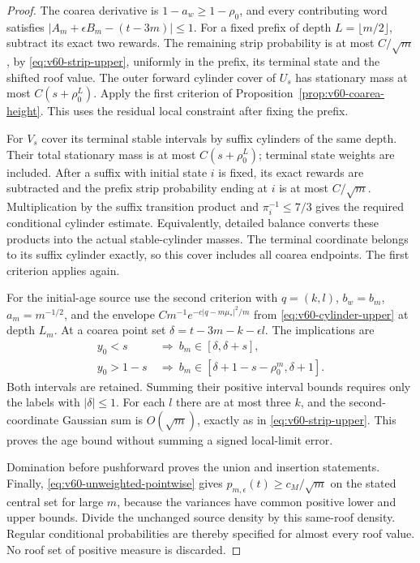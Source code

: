 \begin{proof}
The coarea derivative is $1-a_w\ge1-\rho_0$, and every contributing
word satisfies $|A_m+\epsilon B_m-(t-3m)|\le1$.
For a fixed prefix of depth $L=\lfloor m/2\rfloor$, subtract its
exact two rewards. The remaining strip probability is at most
$C/\sqrt m$, by \eqref{eq:v60-strip-upper}, uniformly in the prefix,
its terminal state and the shifted roof value. The outer forward
cylinder cover of $U_s$ has stationary mass at most $C(s+\rho_0^L)$.
Apply the first criterion of Proposition~\ref{prop:v60-coarea-height}.
This uses the residual local constraint after fixing the prefix.

For $V_s$ cover its terminal stable intervals by suffix cylinders of
the same depth. Their total stationary mass is at most
$C(s+\rho_0^L)$; terminal state weights are included. After a suffix
with initial state $i$ is fixed, its exact rewards are subtracted and
the prefix strip probability ending at $i$ is at most $C/\sqrt m$.
Multiplication by the suffix transition product and
$\pi_i^{-1}\le7/3$ gives the required conditional cylinder estimate.
Equivalently, detailed balance converts these products into the actual
stable-cylinder masses. The terminal coordinate belongs to its suffix
cylinder exactly, so this cover includes all coarea endpoints. The first
criterion applies again.

For the initial-age source use the second criterion with $q=(k,l)$,
$b_w=b_m$, $a_m=m^{-1/2}$, and the envelope
$C m^{-1}e^{-c|q-m\mu_*|^2/m}$ from
\eqref{eq:v60-cylinder-upper} at depth $L_m$.
At a coarea point set $\delta=t-3m-k-\epsilon l$. The implications are
\begin{align*}
 y_0<s&\ \Longrightarrow\ b_m\in[\delta,\delta+s],\\
 y_0>1-s&\ \Longrightarrow\
 b_m\in[\delta+1-s-\rho_0^m,\delta+1].
\end{align*}
Both intervals are retained. Summing their positive interval bounds
requires only the labels with $|\delta|\le1$. For each $l$ there
are at most three $k$, and the second-coordinate Gaussian sum is
$O(\sqrt m)$, exactly as in \eqref{eq:v60-strip-upper}.
This proves the age bound without summing a signed local-limit error.

Domination before pushforward proves the union and insertion statements.
Finally, \eqref{eq:v60-unweighted-pointwise} gives
$p_{m,\epsilon}(t)\ge c_M/\sqrt m$ on the stated central set for
large $m$, because the variances have common positive lower and upper
bounds. Divide the unchanged source density by this same-roof density.
Regular conditional probabilities are thereby specified for almost
every roof value. No roof set of positive measure is discarded.
\end{proof}

